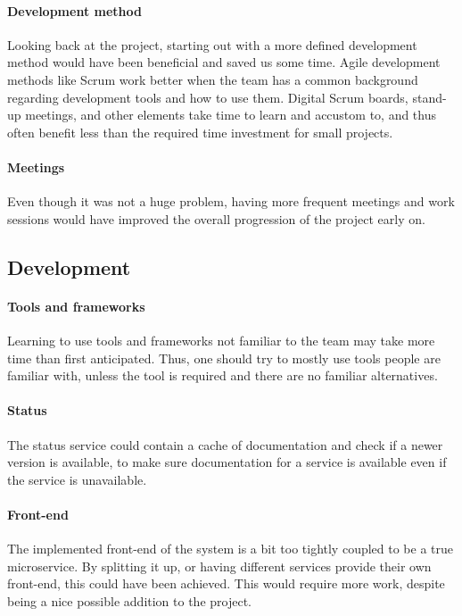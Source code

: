 \paragraph{Development method} Looking back at the project, starting out with a more defined development method would have been beneficial and saved us some time. Agile development methods like Scrum work better when the team has a common background regarding development tools and how to use them. Digital Scrum boards, stand-up meetings, and other elements take time to learn and accustom to, and thus often benefit less than the required time investment for small projects.

\paragraph{Meetings} Even though it was not a huge problem, having more frequent meetings and work sessions would have improved the overall progression of the project early on. 

\subsection{Development}

\paragraph{Tools and frameworks} Learning to use tools and frameworks not familiar to the team may take more time than first anticipated. Thus, one should try to mostly use tools people are familiar with, unless the tool is required and there are no familiar alternatives.

\paragraph{Status} The status service could contain a cache of documentation and check if a newer version is available, to make sure documentation for a service is available even if the service is unavailable.

\paragraph{Front-end} The implemented front-end of the system is a bit too tightly coupled to be a true microservice. By splitting it up, or having different services provide their own front-end, this could have been achieved. This would require more work, despite being a nice possible addition to the project. 

